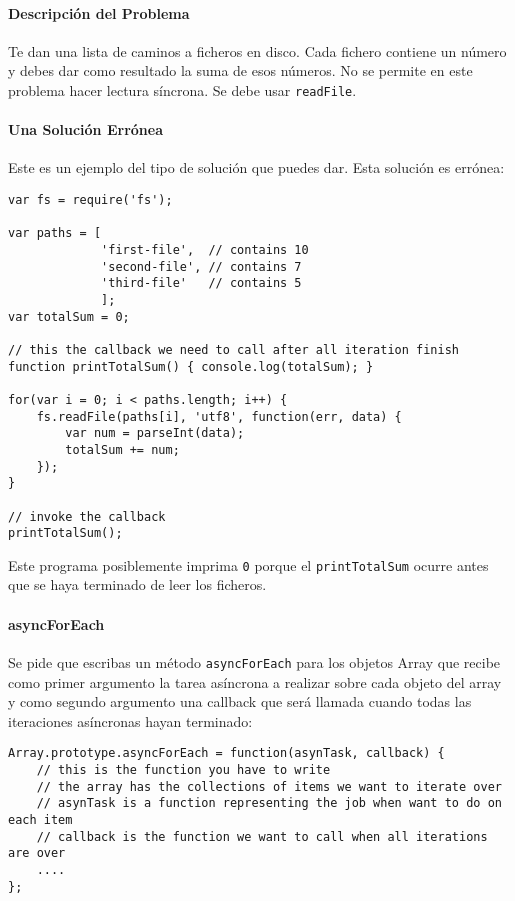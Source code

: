 \paragraph{Descripción del Problema}\label{descripciuxf3n-del-problema}

Te dan una lista de caminos a ficheros en disco. Cada fichero contiene
un número y debes dar como resultado la suma de esos números. No se
permite en este problema hacer lectura síncrona. Se debe usar
\texttt{readFile}.

\paragraph{Una Solución Errónea}\label{una-soluciuxf3n-erruxf3nea}

Este es un ejemplo del tipo de solución que puedes dar. Esta solución es
errónea:

\begin{verbatim}
var fs = require('fs');

var paths = [
             'first-file',  // contains 10
             'second-file', // contains 7
             'third-file'   // contains 5
             ];
var totalSum = 0;

// this the callback we need to call after all iteration finish
function printTotalSum() { console.log(totalSum); }

for(var i = 0; i < paths.length; i++) {
    fs.readFile(paths[i], 'utf8', function(err, data) {
        var num = parseInt(data);
        totalSum += num;
    });
}

// invoke the callback
printTotalSum();
\end{verbatim}

Este programa posiblemente imprima \texttt{0} porque el
\texttt{printTotalSum} ocurre antes que se haya terminado de leer los
ficheros.

\paragraph{asyncForEach}\label{asyncforeach}

Se pide que escribas un método \texttt{asyncForEach} para los objetos
Array que recibe como primer argumento la tarea asíncrona a realizar
sobre cada objeto del array y como segundo argumento una callback que
será llamada cuando todas las iteraciones asíncronas hayan terminado:

\begin{verbatim}
Array.prototype.asyncForEach = function(asynTask, callback) {
    // this is the function you have to write
    // the array has the collections of items we want to iterate over
    // asynTask is a function representing the job when want to do on each item
    // callback is the function we want to call when all iterations are over
    ....
};
\end{verbatim}


